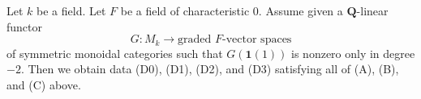 %
\begin{lemma}
\label{lemma-from-functor-to-weil}
Let $k$ be a field. Let $F$ be a field of characteristic $0$.
Assume given a $\mathbf{Q}$-linear functor
$$
G : M_k \longrightarrow \text{graded }F\text{-vector spaces}
$$
of symmetric monoidal categories such that $G(\mathbf{1}(1))$
is nonzero only in degree $-2$. Then we obtain data (D0), (D1), (D2), and (D3)
satisfying all of (A), (B), and (C) above.
\end{lemma}

